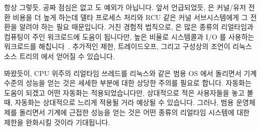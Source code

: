 항상 그렇듯, 공짜 점심은 없고  도 예외가 아닙니다.
앞서 언급되었듯,  은 커널/유저 전환 비용을 더 높게 하는데 델타
프로세스 처리와 RCU 같은 커널 서브시스템에게 그 전환을 알려야 하는 필요
때문입니다.
거친 경험적 법칙으로,  은 많은 종류의 리얼타임과 컴퓨팅이 주인
워크로드에 도움이 됩니다만, 높은 비율로 시스템콜과 I/O 를 사용하는 워크로드를
해칩니다~\cite{AbdullahAljuhni2018nohzfull}.
추가적인 제한, 트레이드오프, 그리고 구성상의 조언이 리눅스 소스 트리의
 에서 얻어질 수 있습니다.

봐왔듯이, CPU 위주의 리얼타임 쓰레드를 리눅스와 같은 범용 OS 에서 돌리면서 기계
수준의 성능을 얻는 것은 세세한 부분에 대한 상당한 주의를 필요로 합니다.
자동화는 도움이 되겠고 어떤 자동화는 적용되었습니다만, 상대적으로 적은
사용자들을 놓고 볼 때, 자동화는 상대적으로 느리게 적용될 거라 예상될 수
있습니다.
그러나, 범용 운영체제를 돌리면서 기계에 근접한 성능을 얻는 것은 어떤 종류의
리얼타임 시스템에 대한 제한을 완화시킬 것이라 기대됩니다.

